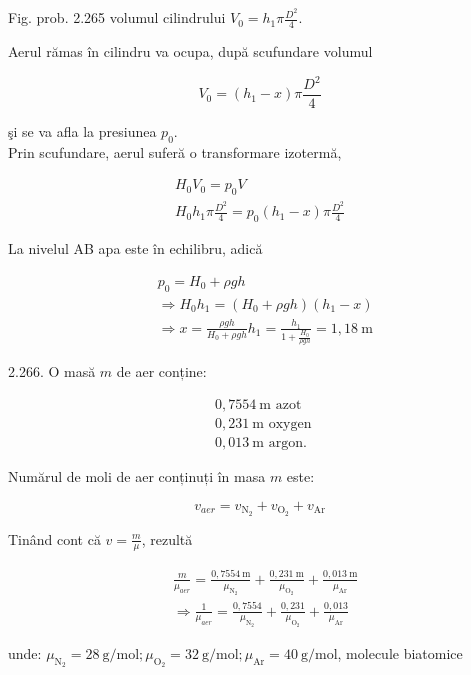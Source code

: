 \documentclass[10pt]{article}
\begin{document}
Fig. prob. 2.265 volumul cilindrului $V_{0}=h_{1} \pi \frac{D^{2}}{4}$.

Aerul rămas în cilindru va ocupa, după scufundare volumul

$$
V_{0}=\left(h_{1}-x\right) \pi \frac{D^{2}}{4}
$$

şi se va afla la presiunea $p_{0}$.\\
Prin scufundare, aerul suferă o transformare izotermă,

$$
\begin{gathered}
H_{0} V_{0}=p_{0} V \\
H_{0} h_{1} \pi \frac{D^{2}}{4}=p_{0}\left(h_{1}-x\right) \pi \frac{D^{2}}{4}
\end{gathered}
$$

La nivelul AB apa este în echilibru, adică

$$
\begin{aligned}
& p_{0}=H_{0}+\rho g h \\
& \Rightarrow H_{0} h_{1}=\left(H_{0}+\rho g h\right)\left(h_{1}-x\right) \\
& \Rightarrow x=\frac{\rho g h}{H_{0}+\rho g h} h_{1}=\frac{h_{1}}{1+\frac{H_{0}}{\rho g h}}=1,18 \mathrm{~m}
\end{aligned}
$$

2.266. O masă $m$ de aer conține:

$$
\begin{aligned}
& 0,7554 \mathrm{~m} \text { azot } \\
& 0,231 \mathrm{~m} \text { oxygen } \\
& 0,013 \mathrm{~m} \text { argon. }
\end{aligned}
$$

Numărul de moli de aer conținuți în masa $m$ este:

$$
v_{a e r}=v_{\mathrm{N}_{2}}+v_{\mathrm{O}_{2}}+v_{\mathrm{Ar}}
$$

Tinând cont că $v=\frac{m}{\mu}$, rezultă

$$
\begin{aligned}
& \frac{m}{\mu_{a e r}}=\frac{0,7554 \mathrm{~m}}{\mu_{\mathrm{N}_{2}}}+\frac{0,231 \mathrm{~m}}{\mu_{\mathrm{O}_{2}}}+\frac{0,013 \mathrm{~m}}{\mu_{\mathrm{Ar}}} \\
& \Rightarrow \frac{1}{\mu_{a e r}}=\frac{0,7554}{\mu_{\mathrm{N}_{2}}}+\frac{0,231}{\mu_{\mathrm{O}_{2}}}+\frac{0,013}{\mu_{\mathrm{Ar}}}
\end{aligned}
$$

unde: $\mu_{\mathrm{N}_{2}}=28 \mathrm{~g} / \mathrm{mol} ; \mu_{\mathrm{O}_{2}}=32 \mathrm{~g} / \mathrm{mol} ; \mu_{\mathrm{Ar}}=40 \mathrm{~g} / \mathrm{mol}$, molecule biatomice
\end{document}
